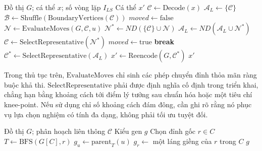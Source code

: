 \documentclass[14pt,a4paper]{extarticle}
\begin{document}
\begin{algorithm}[H]
\caption{Pareto-Lamarck Local Search}
\renewcommand{\alglinenumber}[1]{\normalsize #1.}
\begin{algorithmic}[1]
\Require Đồ thị $G$; cá thể $x$; số vòng lặp $I_{LS}$
\Ensure Cá thể $x'$
\State $\mathcal{C}\leftarrow\mathrm{Decode}(x)$
\State $\mathcal{A}_L\leftarrow\{\mathcal{C}\}$
    \State $\mathcal{B}\leftarrow\mathrm{Shuffle}(\mathrm{BoundaryVertices}(\mathcal{C}))$
    \State $moved\leftarrow\mathrm{false}$
        \State $\mathcal{N}\leftarrow\mathrm{EvaluateMoves}(G,\mathcal{C},u)$
        \State $\mathcal{N}^{*}\leftarrow ND(\{\mathcal{C}\}\cup\mathcal{N})$
        \State $\mathcal{A}_L\leftarrow ND(\mathcal{A}_L\cup\mathcal{N}^{*})$
            \State $\mathcal{C}\leftarrow\mathrm{SelectRepresentative}(\mathcal{N}^{*})$
            \State $moved\leftarrow\mathrm{true}$
        \EndIf
    \EndFor
        \State \textbf{break}
    \EndIf
\EndFor
\State $\mathcal{C}^{*}\leftarrow\mathrm{SelectRepresentative}(\mathcal{A}_L)$
\State $x'\leftarrow\mathrm{Reencode}(G,\mathcal{C}^{*})$
\State \Return $x'$
\end{algorithmic}
\end{algorithm}

Trong thủ tục trên, $\mathrm{EvaluateMoves}$ chỉ sinh các phép chuyển đỉnh thỏa mãn ràng buộc khả thi. $\mathrm{SelectRepresentative}$ phải được định nghĩa cố định trong triển khai, chẳng hạn bằng khoảng cách tới điểm lý tưởng sau chuẩn hóa hoặc một tiêu chí knee-point. Nếu sử dụng chỉ số khoảng cách đám đông, cần ghi rõ rằng nó phục vụ lựa chọn nghiệm có tính đa dạng, không phải tối ưu tuyệt đối.

\begin{algorithm}[H]
\caption{Reencode}
\renewcommand{\alglinenumber}[1]{\normalsize #1.}
\begin{algorithmic}[1]
\Require Đồ thị $G$; phân hoạch liên thông $\mathcal{C}$
\Ensure Kiểu gen $g$
    \State Chọn đỉnh gốc $r\in C$
    \State $T\leftarrow\mathrm{BFS}(G[C],r)$
        \State $g_u\leftarrow\mathrm{parent}_T(u)$
    \EndFor
    \State $g_r\leftarrow$ một láng giềng của $r$ trong $C$
\EndFor
\State \Return $g$
\end{algorithmic}
\end{algorithm}
\end{document}
